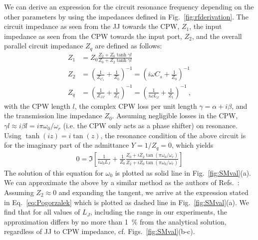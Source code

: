 We can derive an expression for the circuit resonance frequency depending on the other parameters by using the impedances defined in Fig.~\ref{fig:rfderivation}.
%
The circuit impedance as seen from the JJ towards the CPW, $Z_1$, the input impedance as seen from the CPW towards the input port, $Z_2$, and the overall parallel circuit impedance $Z_q$ are defined as follows:
%
\begin{align}
Z_1 &= Z_0 \frac{Z_2+Z_0\tanh\gamma l}{Z_0+Z_2\tanh\gamma l} \\
Z_2 &= \left(\frac{1}{Z_{C_s}}+\frac{1}{Z_0}\right)^{-1} = \left(i\omega C_s+\frac{1}{Z_0}\right)^{-1} \\
Z_q &= \left(\frac{1}{Z_{JJ}}+\frac{1}{Z_1}\right)^{-1} = \left(\frac{1}{i\omega L_J}+\frac{1}{Z_1}\right)^{-1}\ ,
\end{align}
%
with the CPW length $l$, the complex CPW loss per unit length $\gamma=\alpha+i\beta$, and the transmission line impedance $Z_0$.
%
Assuming negligible losses in the CPW, $\gamma l\approx i\beta l = i\pi\omega_0/\omega_r$ (i.e. the CPW only acts as a phase shifter) on resonance.
%
Using $\tanh(iz)=i\tan(z)$, the resonance condition of the above circuit is for the imaginary part of the admittance $Y=1/Z_q=0$, which yields
%
\begin{align}
0 = \Im \left[ \frac{1}{i\omega_0 L_J} + \frac{1}{Z_0}\frac{Z_0+iZ_2\tan\left(\pi\omega_0/\omega_r\right)}{Z_2+iZ_0\tan\left(\pi\omega_0/\omega_r\right)}\right]
\label{eq:SolAnalytical}
\end{align}
%
The solution of this equation for $\omega_0$ is plotted as solid line in Fig.~\ref{fig:SMval}(a).
%
We can approximate the above by a similar method as the authors of Refs.~\cite{wallquistSelectiveCouplingSuperconducting2006a,wustmannParametricResonanceTunable2013,pogorzalekHystereticFluxResponse2017}:
%
Assuming $Z_2\approx 0$ and expanding the tangent, we arrive at the expression stated in Eq.~\ref{eq:Pogorzalek} which is plotted as dashed line in Fig.~\ref{fig:SMval}(a).
%
We find that for all values of $L_J$, including the range in our experiments, the approximation differs by no more than \SI{1}{\percent} from the analytical solution, regardless of JJ to CPW impedance, cf. Figs.~\ref{fig:SMval}(b-c).


